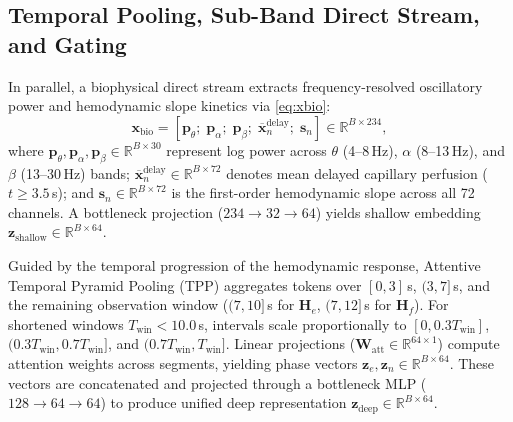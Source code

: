 \documentclass[journal]{IEEEtran}
\begin{document}
\subsection{Temporal Pooling, Sub-Band Direct Stream, and Gating}
In parallel, a biophysical direct stream extracts frequency-resolved oscillatory power and hemodynamic slope kinetics via \eqref{eq:xbio}:
\begin{equation}
\mathbf{x}_{\mathrm{bio}} = \left[ \mathbf{p}_{\theta}; \; \mathbf{p}_{\alpha}; \; \mathbf{p}_{\beta}; \; \overline{\mathbf{x}}_n^{\mathrm{delay}}; \; \mathbf{s}_n \right] \in \mathbb{R}^{B \times 234},
\label{eq:xbio}
\end{equation}
where $\mathbf{p}_{\theta}, \mathbf{p}_{\alpha}, \mathbf{p}_{\beta} \in \mathbb{R}^{B \times 30}$ represent log power across $\theta$ (4--8\,Hz), $\alpha$ (8--13\,Hz), and $\beta$ (13--30\,Hz) bands; $\overline{\mathbf{x}}_n^{\mathrm{delay}} \in \mathbb{R}^{B \times 72}$ denotes mean delayed capillary perfusion ($t \ge 3.5$\,s); and $\mathbf{s}_n \in \mathbb{R}^{B \times 72}$ is the first-order hemodynamic slope across all 72 channels. A bottleneck projection ($234 \to 32 \to 64$) yields shallow embedding $\mathbf{z}_{\mathrm{shallow}} \in \mathbb{R}^{B \times 64}$.

Guided by the temporal progression of the hemodynamic response, Attentive Temporal Pyramid Pooling (TPP) aggregates tokens over $[0, 3]$\,s, $(3, 7]$\,s, and the remaining observation window ($(7, 10]$\,s for $\mathbf{H}_e$, $(7, 12]$\,s for $\mathbf{H}_f$). For shortened windows $T_{\mathrm{win}} < 10.0$\,s, intervals scale proportionally to $[0, 0.3T_{\mathrm{win}}]$, $(0.3T_{\mathrm{win}}, 0.7T_{\mathrm{win}}]$, and $(0.7T_{\mathrm{win}}, T_{\mathrm{win}}]$. Linear projections ($\mathbf{W}_{\mathrm{att}} \in \mathbb{R}^{64 \times 1}$) compute attention weights across segments, yielding phase vectors $\mathbf{z}_e, \mathbf{z}_n \in \mathbb{R}^{B \times 64}$. These vectors are concatenated and projected through a bottleneck MLP ($128 \to 64 \to 64$) to produce unified deep representation $\mathbf{z}_{\mathrm{deep}} \in \mathbb{R}^{B \times 64}$.
\end{document}
